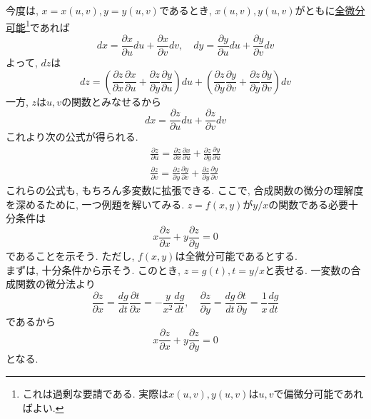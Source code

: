         今度は, $x=x(u,v),y=y(u,v)$であるとき, $x(u,v),y(u,v)$がともに\underline{全微分可能}\footnote{これは過剰な要請である. 実際は$x(u,v),y(u,v)$は$u,v$で偏微分可能であればよい.}であれば
        \begin{equation*}
            dx=\frac{\partial x}{\partial u}du+\frac{\partial x}{\partial v}dv,\quad dy=\frac{\partial y}{\partial u}du+\frac{\partial y}{\partial v}dv
        \end{equation*}
        よって, $dz$は
        \begin{equation*}
            dz=\left(\frac{\partial z}{\partial x}\frac{\partial x}{\partial u}+\frac{\partial z}{\partial y}\frac{\partial y}{\partial u}\right)du+\left(\frac{\partial z}{\partial y}\frac{\partial y}{\partial v}+\frac{\partial z}{\partial y}\frac{\partial y}{\partial v}\right)dv
        \end{equation*}
        一方, $z$は$u,v$の関数とみなせるから
        \begin{equation*}
            dx=\frac{\partial z}{\partial u}du+\frac{\partial z}{\partial v}dv
        \end{equation*}
        これより次の公式が得られる.
        \begin{align}
            \frac{\partial z}{\partial u}=\frac{\partial z}{\partial x}\frac{\partial x}{\partial u}+\frac{\partial z}{\partial y}\frac{\partial y}{\partial u} \label{eq:偏微分:合成関数の微分u}\\
            \frac{\partial z}{\partial v}=\frac{\partial z}{\partial y}\frac{\partial y}{\partial v}+\frac{\partial z}{\partial y}\frac{\partial y}{\partial v} \label{eq:偏微分:合成関数の微分v}
        \end{align}
        これらの公式も, もちろん多変数に拡張できる. 
        \clearpage
        ここで, 合成関数の微分の理解度を深めるために, 一つ例題を解いてみる. $z=f(x,y)$が$y/x$の関数である必要十分条件は
        \begin{equation*}
            x\frac{\partial z}{\partial x}+y\frac{\partial z}{\partial y}=0
        \end{equation*}
        であることを示そう. ただし, $f(x,y)$は全微分可能であるとする.\\

        まずは, 十分条件から示そう. このとき, $z=g(t),t=y/x$と表せる. 一変数の合成関数の微分法より
        \begin{equation*}
            \frac{\partial z}{\partial x}=\frac{dg}{dt}\frac{\partial t}{\partial x}=-\frac{y}{x^2}\frac{dg}{dt},\quad \frac{\partial z}{\partial y}=\frac{dg}{dt}\frac{\partial t}{\partial y}=\frac{1}{x}\frac{dg}{dt}
        \end{equation*}
        であるから
        \begin{equation*}
            x\frac{\partial z}{\partial x}+y\frac{\partial z}{\partial y}=0
        \end{equation*}
        となる.

